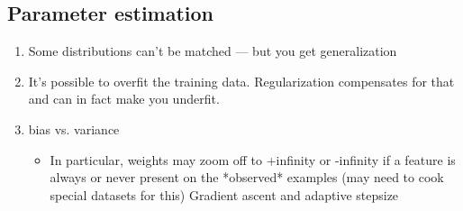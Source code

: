 \documentclass[11pt,letterpaper]{article}
\begin{document}


\subsection{Parameter estimation}
\begin{enumerate}
\item Some distributions can't be matched --- but you get generalization
\item It's possible to overfit the training data.  Regularization compensates for that and can in fact make you underfit.
\item bias vs. variance
\begin{itemize}
\item In particular, weights may zoom off to +infinity or -infinity if a feature is always or never present on the *observed* examples (may need to cook special datasets for this)
Gradient ascent and adaptive stepsize
\end{itemize}
\end{enumerate}
\end{document}
